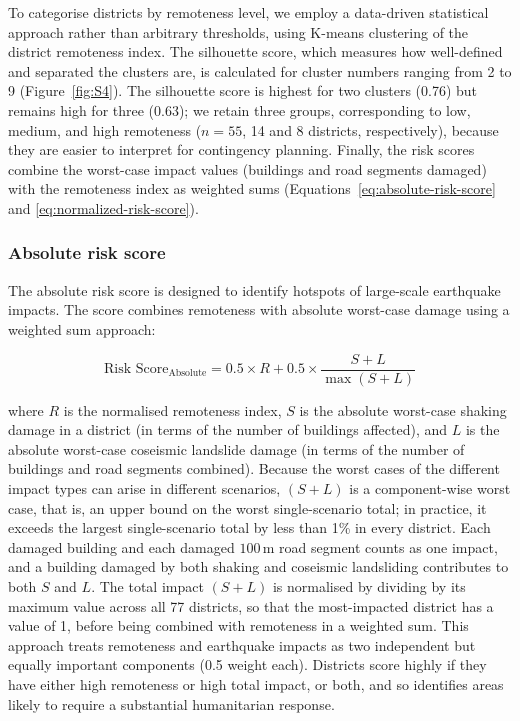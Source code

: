 \documentclass[preprint,12pt,authoryear]{elsarticle}
\begin{document}
To categorise districts by remoteness level, we employ a data-driven statistical approach rather than arbitrary thresholds, using K-means clustering of the district remoteness index. The silhouette score, which measures how well-defined and separated the clusters are, is calculated for cluster numbers ranging from 2 to 9 (Figure~\ref{fig:S4}). The silhouette score is highest for two clusters (0.76) but remains high for three (0.63); we retain three groups, corresponding to low, medium, and high remoteness ($n = 55$, 14 and 8 districts, respectively), because they are easier to interpret for contingency planning. Finally, the risk scores combine the worst-case impact values (buildings and road segments damaged) with the remoteness index as weighted sums (Equations~\ref{eq:absolute-risk-score} and \ref{eq:normalized-risk-score}).

\subsubsection{Absolute risk score}

The absolute risk score is designed to identify hotspots of large-scale earthquake impacts. The score combines remoteness with absolute worst-case damage using a weighted sum approach:

\begin{equation}
\label{eq:absolute-risk-score}
\text{Risk Score}_{\text{Absolute}} = 0.5 \times R + 0.5 \times \frac{S + L}{\max(S + L)}
\end{equation}

where $R$ is the normalised remoteness index, $S$ is the absolute worst-case shaking damage in a district (in terms of the number of buildings affected), and $L$ is the absolute worst-case coseismic landslide damage (in terms of the number of buildings and road segments combined). Because the worst cases of the different impact types can arise in different scenarios, $(S + L)$ is a component-wise worst case, that is, an upper bound on the worst single-scenario total; in practice, it exceeds the largest single-scenario total by less than 1\% in every district. Each damaged building and each damaged $100\,\text{m}$ road segment counts as one impact, and a building damaged by both shaking and coseismic landsliding contributes to both $S$ and $L$. The total impact $(S + L)$ is normalised by dividing by its maximum value across all 77 districts, so that the most-impacted district has a value of 1, before being combined with remoteness in a weighted sum. This approach treats remoteness and earthquake impacts as two independent but equally important components (0.5 weight each). Districts score highly if they have either high remoteness or high total impact, or both, and so identifies areas likely to require a substantial humanitarian response.
\end{document}
